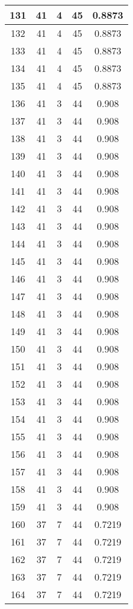 \documentclass[letterpaper, 12pt]{article}
\begin{document}
\begin{longtable}{|c|c|c|c|c|}
\hline
131 & 41 & 4 & 45 & 0.8873 \\
\hline
132 & 41 & 4 & 45 & 0.8873 \\
\hline
133 & 41 & 4 & 45 & 0.8873 \\
\hline
134 & 41 & 4 & 45 & 0.8873 \\
\hline
135 & 41 & 4 & 45 & 0.8873 \\
\hline
136 & 41 & 3 & 44 & 0.908 \\
\hline
137 & 41 & 3 & 44 & 0.908 \\
\hline
138 & 41 & 3 & 44 & 0.908 \\
\hline
139 & 41 & 3 & 44 & 0.908 \\
\hline
140 & 41 & 3 & 44 & 0.908 \\
\hline
141 & 41 & 3 & 44 & 0.908 \\
\hline
142 & 41 & 3 & 44 & 0.908 \\
\hline
143 & 41 & 3 & 44 & 0.908 \\
\hline
144 & 41 & 3 & 44 & 0.908 \\
\hline
145 & 41 & 3 & 44 & 0.908 \\
\hline
146 & 41 & 3 & 44 & 0.908 \\
\hline
147 & 41 & 3 & 44 & 0.908 \\
\hline
148 & 41 & 3 & 44 & 0.908 \\
\hline
149 & 41 & 3 & 44 & 0.908 \\
\hline
150 & 41 & 3 & 44 & 0.908 \\
\hline
151 & 41 & 3 & 44 & 0.908 \\
\hline
152 & 41 & 3 & 44 & 0.908 \\
\hline
153 & 41 & 3 & 44 & 0.908 \\
\hline
154 & 41 & 3 & 44 & 0.908 \\
\hline
155 & 41 & 3 & 44 & 0.908 \\
\hline
156 & 41 & 3 & 44 & 0.908 \\
\hline
157 & 41 & 3 & 44 & 0.908 \\
\hline
158 & 41 & 3 & 44 & 0.908 \\
\hline
159 & 41 & 3 & 44 & 0.908 \\
\hline
160 & 37 & 7 & 44 & 0.7219 \\
\hline
161 & 37 & 7 & 44 & 0.7219 \\
\hline
162 & 37 & 7 & 44 & 0.7219 \\
\hline
163 & 37 & 7 & 44 & 0.7219 \\
\hline
164 & 37 & 7 & 44 & 0.7219 \\
\hline

\end{longtable}
\end{document}
